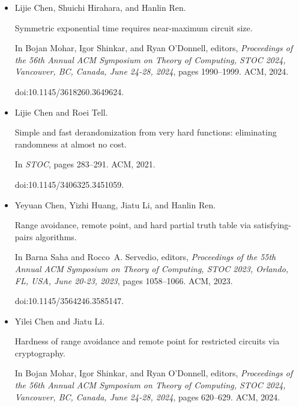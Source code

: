 \documentclass[10pt,a4paper]{article}
\begin{document}
\begin{itemize}
In \emph{21st Annual IEEE Conference on Computational Complexity
(CCC 2006), 16-20 July 2006, Prague, Czech Republic}, pages 73–87. IEEE
Computer Society, 2006.


doi:10.1109/CCC.2006.26.





\item[] 
[5]

Lijie Chen, Shuichi Hirahara, and Hanlin Ren.


Symmetric exponential time requires near-maximum circuit size.


In Bojan Mohar, Igor Shinkar, and Ryan O’Donnell, editors, \emph{Proceedings of the 56th Annual ACM Symposium on Theory of Computing, STOC
2024, Vancouver, BC, Canada, June 24-28, 2024}, pages 1990–1999. ACM,
2024.


doi:10.1145/3618260.3649624.





\item[] 
[6]

Lijie Chen and Roei Tell.


Simple and fast derandomization from very hard functions: eliminating
randomness at almost no cost.


In \emph{STOC}, pages 283–291. ACM, 2021.


doi:10.1145/3406325.3451059.





\item[] 
[7]

Yeyuan Chen, Yizhi Huang, Jiatu Li, and Hanlin Ren.


Range avoidance, remote point, and hard partial truth table via
satisfying-pairs algorithms.


In Barna Saha and Rocco A. Servedio, editors, \emph{Proceedings of the
55th Annual ACM Symposium on Theory of Computing, STOC 2023, Orlando, FL,
USA, June 20-23, 2023}, pages 1058–1066. ACM, 2023.


doi:10.1145/3564246.3585147.





\item[] 
[8]

Yilei Chen and Jiatu Li.


Hardness of range avoidance and remote point for restricted circuits
via cryptography.


In Bojan Mohar, Igor Shinkar, and Ryan O’Donnell, editors, \emph{Proceedings of the 56th Annual ACM Symposium on Theory of Computing, STOC
2024, Vancouver, BC, Canada, June 24-28, 2024}, pages 620–629. ACM, 2024.



\end{itemize}
\end{document}
